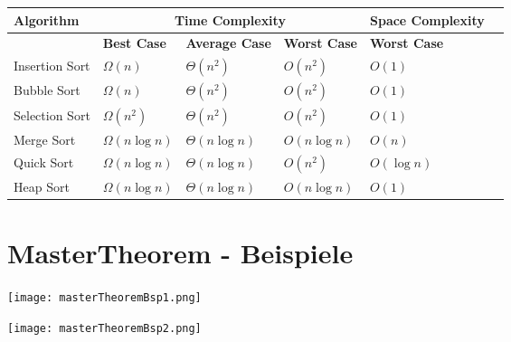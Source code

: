 \begin{table}[h]
    \scriptsize
    \begin{tabularx}{\textwidth}{l | X X X X | l}
        \toprule
    
        \textbf{Algorithm} & \multicolumn{3}{c|}{\textbf{Time Complexity}} & \textbf{Space Complexity} \\
        \midrule
        & \textbf{Best Case} &\textbf{Average Case} & \textbf{Worst Case} & \textbf{Worst Case} \\ 
        \midrule
        Insertion Sort & $\Omega(n)$ & $\Theta(n^2)$ & $O(n^2)$ & $O(1)$ \\
        \midrule
        Bubble Sort & $\Omega(n)$ & $\Theta(n^2)$ & $O(n^2)$ & $O(1)$ \\
        \midrule
        Selection Sort & $\Omega(n^2)$ & $\Theta(n^2)$ & $O(n^2)$ & $O(1)$ \\
        \midrule
        Merge Sort & $\Omega(n \log n)$ & $\Theta(n \log n)$ & $O(n \log n)$ & $O(n)$ \\
        \midrule
        Quick Sort & $\Omega(n \log n)$ & $\Theta(n \log n)$ & $O(n^2)$ & $O(\log n)$ \\
        \midrule
        Heap Sort & $\Omega(n \log n)$ & $\Theta(n \log n)$ & $O(n \log n)$ & $O(1)$ \\
        \midrule

    \end{tabularx}
    \end{table}

\pagebreak

\section{MasterTheorem - Beispiele}
    \centerline{\texttt{[image: masterTheoremBsp1.png]}}
    \centerline{\texttt{[image: masterTheoremBsp2.png]}}
    
